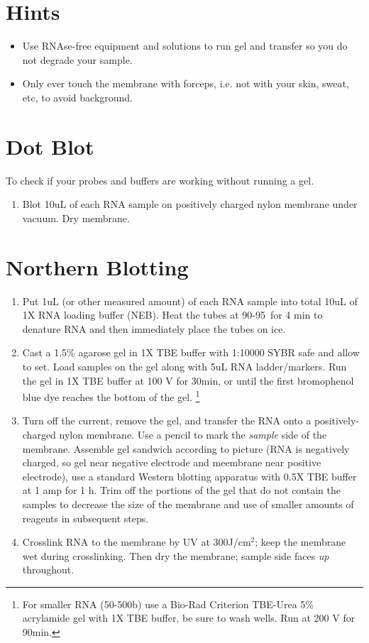 \documentclass{article}
\begin{document}
\section*{Hints}

\begin{itemize}
\item Use RNAse-free equipment and solutions to run gel and transfer so you do not degrade your sample.
  \item Only ever touch the membrane with forceps, i.e. not with your skin, sweat, etc, to avoid background.
\end{itemize}
  

\section*{Dot Blot}

To check if your probes and buffers are working without running a gel.

\begin{enumerate}
\item Blot 10uL of each RNA sample on positively charged nylon membrane under vacuum. Dry membrane.
\end{enumerate}

\section*{Northern Blotting}
\begin{enumerate}
\item Put 1uL (or other measured amount) of each RNA sample into total 10uL of 1X RNA loading buffer (NEB). Heat the tubes at 90-95\celsius\  for 4 min to denature RNA and then immediately place the tubes on ice. 
\item Cast a 1.5\% agarose gel in 1X TBE buffer with 1:10000 SYBR safe and allow to set.
Load samples on the gel along with 5uL RNA ladder/markers. Run the gel in 1X TBE buffer at 100 V for 30min, or until the first bromophenol blue dye reaches the bottom of the gel. 
\footnote{ For smaller RNA (50-500b) use a Bio-Rad Criterion TBE-Urea 5\% acrylamide gel with 1X TBE buffer, be sure to wash wells. Run at 200 V for 90min.}
\item Turn off the current, remove the gel, and transfer the RNA onto a positively-charged nylon membrane. Use a pencil to mark the \emph{sample} side of the membrane. Assemble gel sandwich according to picture (RNA is negatively charged, so gel near negative electrode and meembrane near positive electrode), use a standard Western blotting apparatus with 0.5X TBE buffer at 1 amp for 1 h. Trim off the portions of the gel that do not contain the samples to decrease the size of the membrane and use of smaller amounts of reagents in subsequent steps.
\item Crosslink RNA to the membrane by UV at  300J/cm$^2$; keep the membrane wet during crosslinking. Then dry the membrane; sample side faces \emph{up} throughout.
\end{enumerate}
\end{document}
